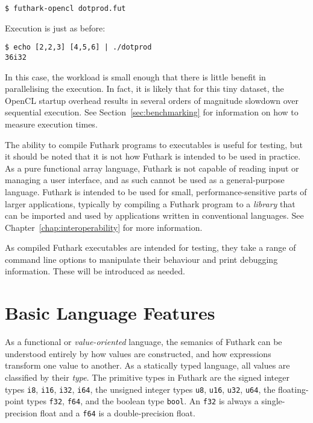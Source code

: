 \documentclass[oneside,11pt]{book}
\begin{document}
\begin{verbatim}
$ futhark-opencl dotprod.fut
\end{verbatim}

\noindent
Execution is just as before:

\begin{verbatim}
$ echo [2,2,3] [4,5,6] | ./dotprod
36i32
\end{verbatim}

In this case, the workload is small enough that there is little
benefit in parallelising the execution.  In fact, it is likely that
for this tiny dataset, the OpenCL startup overhead results in several
orders of magnitude slowdown over sequential execution.  See
Section~\ref{sec:benchmarking} for information on how to measure
execution times.

The ability to compile Futhark programs to executables is useful for
testing, but it should be noted that it is not how Futhark is intended
to be used in practice.  As a pure functional array language, Futhark
is not capable of reading input or managing a user interface, and as
such cannot be used as a general-purpose language.  Futhark is
intended to be used for small, performance-sensitive parts of larger
applications, typically by compiling a Futhark program to a
\textit{library} that can be imported and used by applications written
in conventional languages.  See Chapter~\ref{chap:interoperability}
for more information.

As compiled Futhark executables are intended for testing, they take a
range of command line options to manipulate their behaviour and print
debugging information.  These will be introduced as needed.

\section{Basic Language Features}
\label{sec:baselang}
As a functional or \textit{value-oriented} language, the semanics of
Futhark can be understood entirely by how values are constructed, and
how expressions transform one value to another.  As a statically typed
language, all values are classified by their \textit{type}.  The
primitive types in Futhark are the signed integer types \texttt{i8},
\texttt{i16}, \texttt{i32}, \texttt{i64}, the unsigned integer types
\texttt{u8}, \texttt{u16}, \texttt{u32}, \texttt{u64}, the
floating-point types \texttt{f32}, \texttt{f64}, and the boolean type
\texttt{bool}.  An \texttt{f32} is always a single-precision float and
a \texttt{f64} is a double-precision float.
\end{document}
